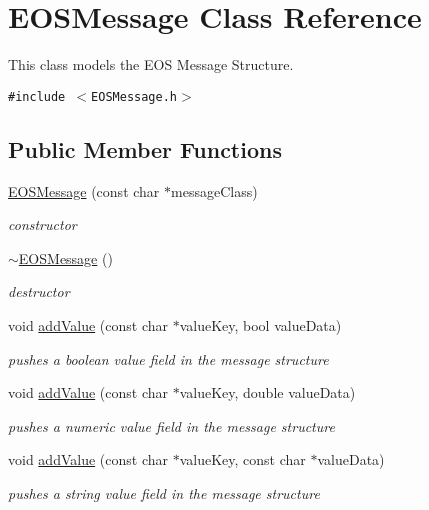 \hypertarget{classEOSMessage}{
\section{EOSMessage Class Reference}
\label{classEOSMessage}
}
This class models the EOS Message Structure.  


{\tt \#include $<$EOSMessage.h$>$}

\subsection*{Public Member Functions}
\begin{CompactItemize}
\item 
\hyperlink{classEOSMessage_4f107c4d2bc222fff75d0a600f8ebfa9}{EOSMessage} (const char $\ast$messageClass)
\begin{CompactList}\small\item\em constructor \item\end{CompactList}\item 
\hyperlink{classEOSMessage_57e0677a37c99625d6480d91a910a8bc}{$\sim$EOSMessage} ()
\begin{CompactList}\small\item\em destructor \item\end{CompactList}\item 
void \hyperlink{classEOSMessage_7eea6ddaa2fc88e278f1b8916a72da94}{addValue} (const char $\ast$valueKey, bool valueData)
\begin{CompactList}\small\item\em pushes a boolean value field in the message structure \item\end{CompactList}\item 
void \hyperlink{classEOSMessage_fa321169de1d36442816d52085a2d7c8}{addValue} (const char $\ast$valueKey, double valueData)
\begin{CompactList}\small\item\em pushes a numeric value field in the message structure \item\end{CompactList}\item 
void \hyperlink{classEOSMessage_4e26aa7bc47fb80d6b06cbdb12b63a51}{addValue} (const char $\ast$valueKey, const char $\ast$valueData)
\begin{CompactList}\small\item\em pushes a string value field in the message structure \item\end{CompactList}\item 

\end{CompactItemize}
